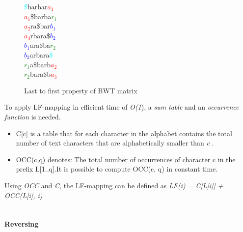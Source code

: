 \documentclass[11pt,a4paper]{report}
\begin{document}
\begin{figure}[H]
\centering
\textcolor{cyan}{\$}barbar\textcolor{red}{$a_1$}\\
\textcolor{red}{$a_1$}\$barba\textcolor{green}{$r_1$}\\
\textcolor{red}{$a_2$}ra\$bar\textcolor{blue}{$b_1$}\\
\textcolor{red}{$a_3$}rbara\$\textcolor{blue}{$b_2$}\\
\textcolor{blue}{$b_1$}ara\$ba\textcolor{green}{$r_2$}\\
\textcolor{blue}{$b_2$}arbara\textcolor{cyan}{\$}\\
\textcolor{green}{$r_1$}a\$barb\textcolor{red}{$a_2$}\\
\textcolor{green}{$r_2$}bara\$b\textcolor{red}{$a_3$}
 \caption{Last to first property of BWT matrix}
 \label{Lemma1}
\end{figure}

To apply LF-mapping in efficient time of \emph{O(1}), a \emph{sum table} and an \emph{occurrence function }is needed.\\


\begin{itemize}

	\item C[c] is a table that for each character in the alphabet contains the total number of text characters that are alphabetically smaller than \emph{c} \cite{fmindex}.

	
	\item OCC(c,q) denotes:  The total number of occurrences of character c in the prefix L[1..q]\cite{fmindex}.It is possible to compute OCC(c, q) in constant time.
	
\end{itemize}

Using \emph{OCC} and \emph{C}, the LF-mapping can be defined as \emph{LF(i) = C[L[i]] + OCC(L[i], i)} \\\\

\paragraph{Reversing}
\end{document}
